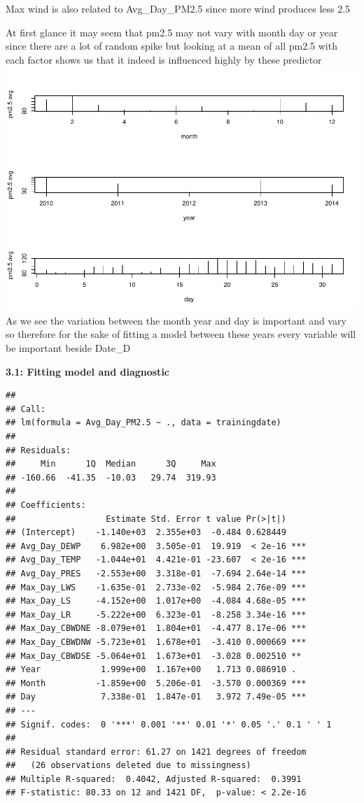\documentclass[
]{article}
\begin{document}
Max wind is also related to Avg\_Day\_PM2.5 since more wind produces
less 2.5

At first glance it may seem that pm2.5 may not vary with month day or
year since there are a lot of random spike but looking at a mean of all
pm2.5 with each factor shows us that it indeed is influenced highly by
these predictor
\includegraphics{Final_Project_2_files/figure-latex/unnamed-chunk-7-1.pdf}
As we see the variation between the month year and day is important and
vary so therefore for the sake of fitting a model between these years
every variable will be important beside Date\_D

\textbf{3.1: Fitting model and diagnostic}

\begin{verbatim}
## 
## Call:
## lm(formula = Avg_Day_PM2.5 ~ ., data = trainingdate)
## 
## Residuals:
##     Min      1Q  Median      3Q     Max 
## -160.66  -41.35  -10.03   29.74  319.93 
## 
## Coefficients:
##                  Estimate Std. Error t value Pr(>|t|)    
## (Intercept)    -1.140e+03  2.355e+03  -0.484 0.628449    
## Avg_Day_DEWP    6.982e+00  3.505e-01  19.919  < 2e-16 ***
## Avg_Day_TEMP   -1.044e+01  4.421e-01 -23.607  < 2e-16 ***
## Avg_Day_PRES   -2.553e+00  3.318e-01  -7.694 2.64e-14 ***
## Max_Day_LWS    -1.635e-01  2.733e-02  -5.984 2.76e-09 ***
## Max_Day_LS     -4.152e+00  1.017e+00  -4.084 4.68e-05 ***
## Max_Day_LR     -5.222e+00  6.323e-01  -8.258 3.34e-16 ***
## Max_Day_CBWDNE -8.079e+01  1.804e+01  -4.477 8.17e-06 ***
## Max_Day_CBWDNW -5.723e+01  1.678e+01  -3.410 0.000669 ***
## Max_Day_CBWDSE -5.064e+01  1.673e+01  -3.028 0.002510 ** 
## Year            1.999e+00  1.167e+00   1.713 0.086910 .  
## Month          -1.859e+00  5.206e-01  -3.570 0.000369 ***
## Day             7.338e-01  1.847e-01   3.972 7.49e-05 ***
## ---
## Signif. codes:  0 '***' 0.001 '**' 0.01 '*' 0.05 '.' 0.1 ' ' 1
## 
## Residual standard error: 61.27 on 1421 degrees of freedom
##   (26 observations deleted due to missingness)
## Multiple R-squared:  0.4042, Adjusted R-squared:  0.3991 
## F-statistic: 80.33 on 12 and 1421 DF,  p-value: < 2.2e-16
\end{verbatim}
\end{document}

